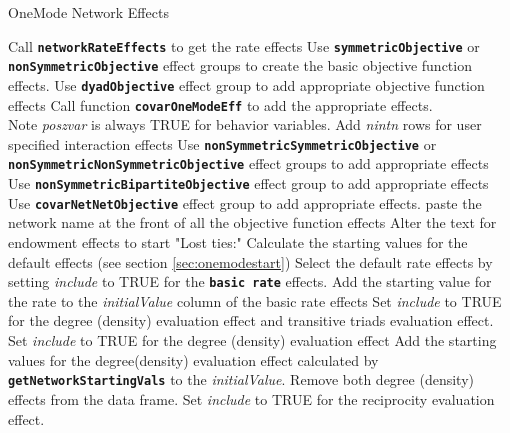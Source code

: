 \documentclass[12pt,a4paper]{article}
\makeatletter
\renewcommand{\=}{\,=\,}
\newcommand{\+}{\,+\,}
\newcommand{\nnm}[1]{\textsf{\textit{#1}}}
\renewcommand{\subsection}{\@startsection{subsection}{2}
                {0pt}{0.7\baselineskip}{0.3\baselineskip}
                {\sffamily} }
\newcommand{\sfn}[1]{\textbf{\texttt{#1}}}
\makeatother
\begin{document}
\subsection{OneMode Network Effects}
\begin{algorithmic}
  \STATE Call \sfn{networkRateEffects} to get the rate effects
  \STATE Use \sfn{symmetricObjective} or \sfn{nonSymmetricObjective} effect
  groups to create the basic objective function effects.
  \STATE Use \sfn{dyadObjective} effect group to add appropriate objective
  function effects
  \ENDFOR
  \STATE Call function \sfn{covarOneModeEff} to add the appropriate effects.\\
  Note \nnm{poszvar} is always TRUE for behavior variables.
  \ENDFOR
  \STATE Add \nnm{nintn} rows for user specified interaction effects
  \ENDIF
  \STATE Use \sfn{nonSymmetricSymmetricObjective} or
  \sfn{nonSymmetricNonSymmetricObjective} effect groups to add appropriate
effects
  \STATE Use \sfn{nonSymmetricBipartiteObjective} effect group to add
  appropriate effects
  \ENDIF
  \STATE Use \sfn{covarNetNetObjective} effect group to add appropriate effects.
  \ENDFOR
  \ENDFOR
  \STATE paste the network name at the front of all the objective function
  effects
  \ENDIF
  \STATE Alter the text for endowment effects to start "Lost ties:"
  \STATE Calculate the starting values for the default effects
  (see section \ref{sec:onemodestart})
  \STATE Select the default rate effects by setting \nnm{include} to TRUE for
  the \sfn{basic rate} effects.
  \STATE Add the starting value for the rate to the \nnm{initialValue} column
  of the basic rate effects
  \STATE Set \nnm{include} to TRUE for the degree (density) evaluation effect
  and transitive triads evaluation effect.
  \ELSE
  \STATE  Set \nnm{include} to TRUE for the degree (density) evaluation effect
  \STATE Add the starting values for the degree(density) evaluation effect
  calculated by \sfn{getNetworkStartingVals} to the \nnm{initialValue}.
  \ELSE
  \STATE Remove both degree (density) effects from the data frame.
  \ENDIF
  \STATE Set \nnm{include} to TRUE for the reciprocity evaluation effect.
  \ENDIF
\end{algorithmic}
\end{document}
